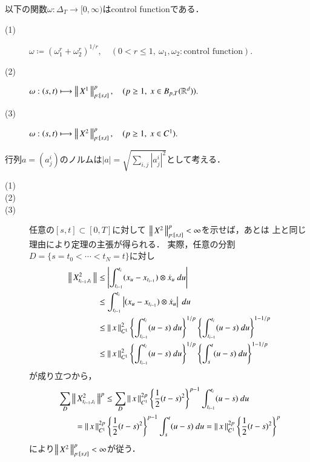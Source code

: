 	\begin{screen}
		\begin{thm}\label{thm:examples_of_control_functions}
			以下の関数$\omega:\Delta_T \longrightarrow [0,\infty)$はcontrol functionである．
			\begin{description}
				\item[(1)] $\omega \coloneqq \left( \omega_1^r + \omega_2^r \right)^{1/r},
					\quad (0 < r \leq 1,\ \omega_1,\omega_2:\mbox{control function}).$
				\item[(2)] $\omega:(s,t) \longmapsto \left\|\, X^1\, \right\|_{p:[s,t]}^p,
					\quad (p \geq 1,\ x \in B_{p,T}(\mathbb{R}^d)).$
				\item[(3)] $\omega:(s,t) \longmapsto \left\|\, X^2\, \right\|_{p:[s,t]}^p,
					\quad (p \geq 1,\ x \in C^1).$
			\end{description}
		\end{thm}
	\end{screen}
	
	行列$a = (a_j^i)$のノルムは$|a| = \sqrt{\sum_{i,j}|a_j^i|^2}$として考える．
	
	\begin{thm}\mbox{}
		\begin{description}
			\item[(1)]
			\item[(2)] 
				
			\item[(3)] 任意の$[s,t] \subset [0,T]$に対して
				$\left\|\, X^2\, \right\|_{p:[s,t]}^p < \infty$を示せば，あとは
				上と同じ理由により定理の主張が得られる．
				実際，任意の分割$D = \{s=t_0 < \cdots < t_N = t\}$に対し
				\begin{align}
					\left\|\, X^2_{t_{i-1},t_i}\, \right\|_{}
					&\leq \left| \int_{t_{i-1}}^{t_i} (x_u - x_{t_{i-1}}) \otimes \dot{x}_u\ du \right| \\
					&\leq \int_{t_{i-1}}^{t_i} \left| (x_u - x_{t_{i-1}}) \otimes \dot{x}_u \right|\ du \\
					&\leq \left\|\, x\, \right\|_{C^1}^2 \left\{ \int_{t_{i-1}}^{t_i} (u-s)\ du \right\}^{1/p}
						\left\{ \int_{t_{i-1}}^{t_i} (u-s)\ du \right\}^{1-1/p} \\
					&\leq \left\|\, x\, \right\|_{C^1}^2 \left\{ \int_{t_{i-1}}^{t_i} (u-s)\ du \right\}^{1/p}
						\left\{ \int_s^t (u-s)\ du \right\}^{1-1/p}
				\end{align}
				が成り立つから，
				\begin{align}
					&\sum_D \left\|\, X^2_{t_{i-1},t_i}\, \right\|_{}^p
					\leq \sum_D \left\|\, x\, \right\|_{C^1}^{2p} \left\{ \frac{1}{2}(t-s)^2 \right\}^{p-1}
						\int_{t_{i-1}}^{t_i} (u-s)\ du \\
					&\qquad= \left\|\, x\, \right\|_{C^1}^{2p} \left\{ \frac{1}{2}(t-s)^2 \right\}^{p-1}
						\int_s^t (u-s)\ du
					= \left\|\, x\, \right\|_{C^1}^{2p} \left\{ \frac{1}{2}(t-s)^2 \right\}^p
				\end{align}
				により$\left\|\, X^2\, \right\|_{p:[s,t]}^p < \infty$が従う．
				\QED
		\end{description}
	\end{thm}
	
